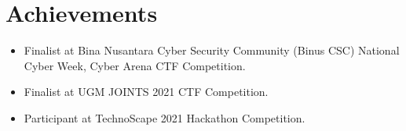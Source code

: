 \documentclass[10pt]{article}
\begin{document}
\section{Achievements}

\begin{itemize}
    \item Finalist at Bina Nusantara Cyber Security Community (Binus CSC)
        National Cyber Week, Cyber Arena CTF Competition.
    \item Finalist at UGM JOINTS 2021 CTF Competition.
    \item Participant at TechnoScape 2021 Hackathon Competition.
\end{itemize}
\end{document}
